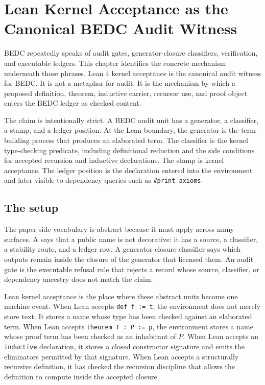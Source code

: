 \chapter{Lean Kernel Acceptance as the Canonical BEDC Audit Witness}
\label{ch:visions-kernel-acceptance-as-audit-witness}

BEDC repeatedly speaks of audit gates, generator-closure classifiers,
\NameCert{} verification, and executable ledgers. This chapter identifies the
concrete mechanism underneath those phrases. Lean 4 kernel acceptance is the
canonical audit witness for BEDC. It is not a metaphor for audit. It is the
mechanism by which a proposed definition, theorem, inductive carrier, recursor
use, and proof object enters the BEDC ledger as checked content.

The claim is intentionally strict. A BEDC audit unit has a generator, a
classifier, a stamp, and a ledger position. At the Lean boundary, the generator
is the term-building process that produces an elaborated term. The classifier is
the kernel type-checking predicate, including definitional reduction and the
side conditions for accepted recursion and inductive declarations. The stamp is
kernel acceptance. The ledger position is the declaration entered into the
environment and later visible to dependency queries such as
\texttt{\#print axioms}.

\section{The setup}
\label{sec:kernel-audit-witness-setup}

The paper-side vocabulary is abstract because it must apply across many
surfaces. A \NameCert{} says that a public name is not decorative: it has a
source, a classifier, a stability route, and a ledger row. A generator-closure
classifier says which outputs remain inside the closure of the generator that
licensed them. An audit gate is the executable refusal rule that rejects a
record whose source, classifier, or dependency ancestry does not match the
claim.

Lean kernel acceptance is the place where these abstract units become one
machine event. When Lean accepts
\texttt{def f := t}, the environment does not merely store text. It stores a
name whose type has been checked against an elaborated term. When Lean accepts
\texttt{theorem T : P := p}, the environment stores a name whose proof term has
been checked as an inhabitant of $P$. When Lean accepts an
\texttt{inductive} declaration, it stores a closed constructor signature and
emits the eliminators permitted by that signature. When Lean accepts a
structurally recursive definition, it has checked the recursion discipline that
allows the definition to compute inside the accepted closure.

